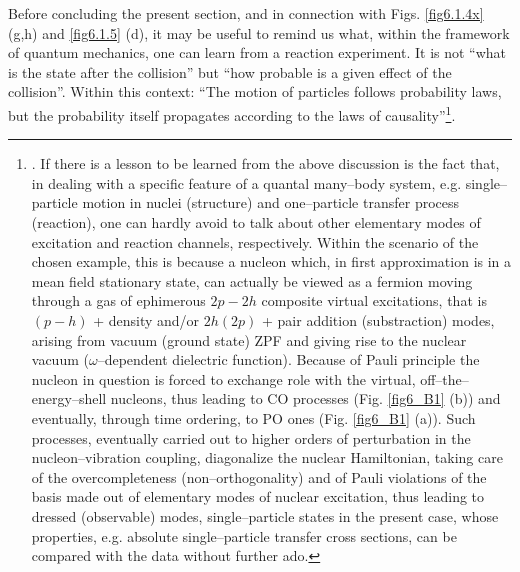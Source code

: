  Before concluding the present section, and in connection with Figs. \ref{fig6.1.4x} (g,h) and \ref{fig6.1.5} (d), it may be useful to remind us what, within the framework of quantum mechanics, one can learn from a reaction experiment. It is not ``what is the state after the collision'' but ``how probable is a given effect of the collision''. Within this context: ``The motion of particles follows probability laws, but the probability itself propagates according to the laws of causality''\footnote{\cite{Born:26}. If there is a lesson to be learned from the above discussion is the fact that, in dealing with a specific feature of a quantal many--body system, e.g. single--particle motion in nuclei (structure) and one--particle transfer process (reaction), one can hardly avoid to talk about other elementary modes of excitation and  reaction channels, respectively. Within the scenario of the chosen example, this is because a nucleon which, in first approximation is in a mean field stationary state, can actually be viewed as a fermion moving through a gas of ephimerous $2p-2h$ composite virtual excitations, that is $(p-h)$ + density and/or $2h(2p)$ + pair addition (substraction) modes, arising from vacuum (ground state) ZPF and giving rise to the nuclear vacuum ($\omega$--dependent dielectric function). Because of Pauli principle \citep{Pauli:47} the nucleon in question is forced to exchange role with the virtual, off--the--energy--shell nucleons, thus leading to CO processes (Fig. \ref{fig6_B1} (b)) and eventually, through time ordering, to PO ones (Fig. \ref{fig6_B1} (a)). Such processes, eventually carried out to higher orders of perturbation in the nucleon--vibration coupling, diagonalize the nuclear Hamiltonian, taking care of the overcompleteness (non--orthogonality) and of Pauli violations of the basis made out of elementary modes of nuclear excitation, thus leading to dressed (observable) modes, single--particle states in the present case, whose properties, e.g. absolute single--particle transfer cross sections, can be compared with the data without further ado.}.





